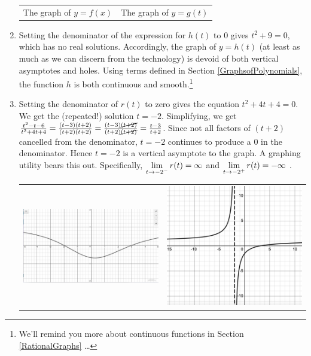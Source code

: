\documentclass{ximera}
\begin{document}
\begin{ex}
\begin{enumerate}
\begin{center}
\begin{tabular}{cc}
The graph of $y=f(x)$  \hspace{0.75in} & The graph of $y=g(t)$ \\


\end{tabular}
\end{center} 

\item  Setting the denominator of the expression for $h(t)$ to $0$ gives $t^2+9 = 0$, which has no real solutions.  Accordingly, the graph of $y=h(t)$ (at least as much as we can discern from the technology) is devoid of both vertical asymptotes and holes.  Using terms defined in Section \ref{GraphsofPolynomials},  the function $h$ is both continuous and smooth.\footnote{We'll remind you more about continuous functions in Section \ref{RationalGraphs}  \ldots}

\item  Setting the denominator of $r(t)$ to zero gives the equation $t^2+4t+4 = 0$.  We get  the (repeated!) solution $t=-2$.  Simplifying, we get  $\frac{t^2-t-6}{t^2+4t+4} = \frac{(t-3)(t+2)}{(t+2)(t+2)}  =  \frac{(t-3)\cancel{(t+2)}}{(t+2)\cancel{(t+2)}} =  \frac{t-3}{t+2}$.  Since  not all factors of $(t+2)$ cancelled from the denominator, $t=-2$ continues to produce a $0$ in the denominator.  Hence $t=-2$ is a vertical asymptote to the graph.  A graphing utility bears this out.  Specifically,     $\ds{\lim_{t \rightarrow -2^{-}} r(t) = \infty}$ and  $\ds{\lim_{t \rightarrow -2^{+}} r(t) = -\infty}$ .

\begin{center}

\begin{tabular}{cc}

\includegraphics[width=3in]{./IntroRationalGraphics/VAorHoleEx03.jpg} & \includegraphics[width=3in]{./IntroRationalGraphics/VAorHoleEx04.png} \\


\end{tabular}
\end{center}
\end{enumerate}
\end{ex}
\end{document}
